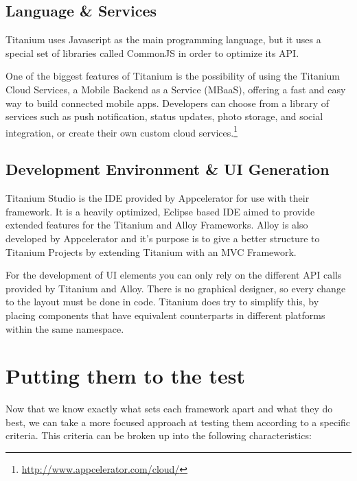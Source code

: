 \subsection{Language \& Services}
Titanium uses Javascript as the main programming language, but it uses a special set of libraries called CommonJS in order to optimize its \ac{API}.

One of the biggest features of Titanium is the possibility of using the Titanium Cloud Services, a Mobile Backend as a Service (MBaaS), offering a fast and easy way to build connected mobile apps. Developers can choose from a library of services such as push notification, status updates, photo storage, and social integration, or create their own custom cloud services.\footnote{\url{http://www.appcelerator.com/cloud/}} 



\subsection{Development Environment \& UI Generation}
Titanium Studio is the \ac{IDE} provided by Appcelerator for use with their framework. It is a heavily optimized, Eclipse based \ac{IDE} aimed to provide extended features for the Titanium and Alloy Frameworks. Alloy is also developed by Appcelerator and it's purpose is to give a better structure to Titanium Projects by extending Titanium with an \ac{MVC} Framework.

For the development of \ac{UI} elements you can only rely on the different \ac{API} calls provided by Titanium and Alloy. There is no graphical designer, so every change to the layout must be done in code. Titanium does try to simplify this, by placing components that have equivalent counterparts in different platforms within the same namespace.   



\section{Putting them to the test}
Now that we know exactly what sets each framework apart and what they do best, we can take a more focused approach at testing them according to a specific criteria. This criteria can be broken up into the following characteristics:


